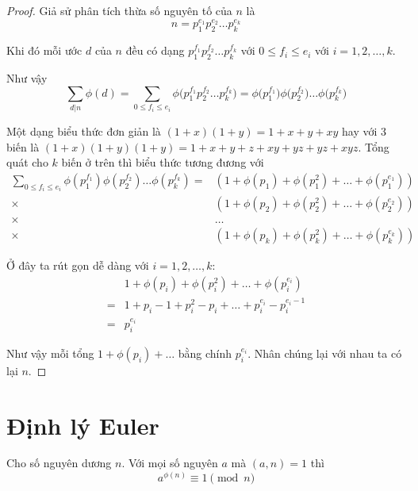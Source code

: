 \begin{proof}
    Giả sử phân tích thừa số nguyên tố của $n$ là 
    \[n = p_1^{e_1} p_2^{e_2} \ldots p_k^{e_k}\]

    Khi đó mỗi ước $d$ của $n$ đều có dạng $p_1^{f_1} p_2^{f_2} \ldots p_k^{f_k}$
    với $0 \leq f_i \leq e_i$ với $i = 1, 2, \ldots, k$.

    Như vậy
    \[\sum_{d | n} \phi(d) = \sum_{0 \leq f_i \leq e_i} \phi\Big(p_1^{f_1} p_2^{f_2} 
    \ldots p_k^{f_k}\Big)
    = \phi\Big(p_1^{f_1}\Big) \phi\Big(p_2^{f_2}\Big) \ldots \phi\Big(p_k^{f_k}\Big)\]

    Một dạng biểu thức đơn giản là $(1+x)(1+y) = 1+x+y+xy$ hay với 3 biến
    là $(1+x)(1+y)(1+y) = 1 + x + y + z + xy + yz + yz + xyz$. Tổng quát cho 
    $k$ biến ở trên thì biểu thức tương đương với
    \begin{align*}
    \sum_{0 \leq f_i \leq e_i} \phi(p_1^{f_1}) \phi(p_2^{f_2}) \ldots
    \phi(p_k^{f_k}) = & (1 + \phi(p_1) + \phi(p_1^2) + \ldots + \phi(p_1^{e_1})) \\
    \times & (1 + \phi(p_2) + \phi(p_2^2) + \ldots + \phi(p_2^{e_2})) \\
    \times & \ldots \\
    \times & (1 + \phi(p_k) + \phi(p_k^2) + \ldots + \phi(p_k^{e_k}))
    \end{align*}

    Ở đây ta rút gọn dễ dàng với $i = 1, 2, \ldots, k$:
    \begin{align*}
    & 1 + \phi(p_i) + \phi(p_i^2) + \ldots + \phi(p_i^{e_i}) \\
    = & 1 + p_i - 1 + p_i^2 - p_i + \ldots + p_i^{e_i} - p_i^{e_i-1} \\
    = & p_i^{e_i}
    \end{align*}

    Như vậy mỗi tổng $1 + \phi(p_i) + \ldots$ bằng chính $p_i^{e_i}$. 
    Nhân chúng lại với nhau ta có lại $n$.
\end{proof}

\section{Định lý Euler}

    \begin{theorem}    
        Cho số nguyên dương $n$. Với mọi số nguyên $a$ mà $(a, n) = 1$ thì 
        \[a^{\phi(n)} \equiv 1 \pmod n\]
    \end{theorem}

